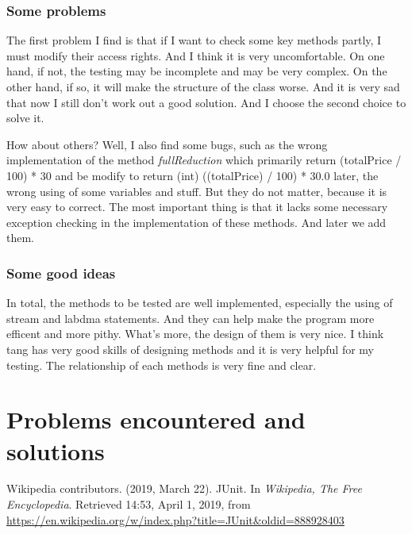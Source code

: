 \documentclass[a4paper]{report}
\begin{document}
\subsection{Some problems}
\par The first problem I find is that if I want to check some key methods partly, I must modify their access rights. And I think it is very uncomfortable. On one hand, if not, the testing may be incomplete and may be very complex. On the other hand, if so, it will make the structure of the class worse. And it is very sad that now I still don't work out a good solution. And I choose the second choice to solve it.
\par How about others? Well, I also find some bugs, such as the wrong implementation of the method \emph{fullReduction} which primarily return (totalPrice / 100) * 30 and be modify to return (int) ((totalPrice) / 100) * 30.0 later, the wrong using of some variables and stuff. But they do not matter, because it is very easy to correct. The most important thing is that it lacks some necessary exception checking in the implementation of these methods. And later we add them. 
\subsection{Some good ideas}
\par In total, the methods to be tested are well implemented, especially the using of stream and labdma statements. And they can help make the program more efficent and more pithy. What's more, the design of them is very nice. I think tang has very good skills of designing methods and it is very helpful for my testing. The relationship of each methods is very fine and clear.
\chapter{Problems encountered and solutions}
\begin{thebibliography}{A}

Wikipedia contributors. (2019, March 22). JUnit. In \emph{Wikipedia, The Free Encyclopedia}. Retrieved 14:53, April 1, 2019, from \url{https://en.wikipedia.org/w/index.php?title=JUnit&oldid=888928403}

\end{thebibliography}
\end{document}
